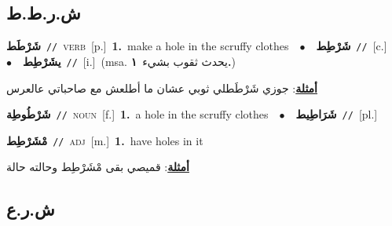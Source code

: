 \documentclass[10pt,a4paper,twoside]{article} %
\begin{document}
\begin{multicols}{2}
\vspace{-3mm}
\subsection*{\color{blue}\foreignlanguage{arabic}{ش.ر.ط.ط}\color{blue}{}} 

{\setlength\topsep{0pt}\textbf{\foreignlanguage{arabic}{شَرْطَط}}\ {\color{gray}\texttt{//}\color{black}}\ \textsc{verb}\ [p.]\ \textbf{1.}~make a hole in the scruffy clothes\ \ $\bullet$\ \ \setlength\topsep{0pt}\textbf{\foreignlanguage{arabic}{شَرْطِط}}\ {\color{gray}\texttt{//}\color{black}}\ [c.]\ \ $\bullet$\ \ \setlength\topsep{0pt}\textbf{\foreignlanguage{arabic}{يشَرْطِط}}\ {\color{gray}\texttt{//}\color{black}}\ [i.]\ \color{gray}(msa. \foreignlanguage{arabic}{يحدث ثقوب بشيء}~\foreignlanguage{arabic}{\textbf{١.}})\color{black}\  \begin{flushright}\color{gray}\foreignlanguage{arabic}{\textbf{\underline{\foreignlanguage{arabic}{أمثلة}}}: جوزي شَرْطَطلي ثوبي عشان ما أطلعش مع صاحباتي عالعرس}\end{flushright}\color{black}} \vspace{2mm}

{\setlength\topsep{0pt}\textbf{\foreignlanguage{arabic}{شَرْطُوطِة}}\ {\color{gray}\texttt{//}\color{black}}\ \textsc{noun}\ [f.]\ \textbf{1.}~a hole in the scruffy clothes\ \ $\bullet$\ \ \setlength\topsep{0pt}\textbf{\foreignlanguage{arabic}{شَرَاطِيط}}\ {\color{gray}\texttt{//}\color{black}}\ [pl.]\ } \vspace{2mm}

{\setlength\topsep{0pt}\textbf{\foreignlanguage{arabic}{مْشَرْطِط}}\ {\color{gray}\texttt{//}\color{black}}\ \textsc{adj}\ [m.]\ \textbf{1.}~have holes in it\  \begin{flushright}\color{gray}\foreignlanguage{arabic}{\textbf{\underline{\foreignlanguage{arabic}{أمثلة}}}: قميصي بقى مْشَرْطِط وحالته حالة}\end{flushright}\color{black}} \vspace{2mm}

\vspace{-3mm}
\subsection*{\color{blue}\foreignlanguage{arabic}{ش.ر.ع}\color{blue}{}} 


\end{multicols}
\end{document}
